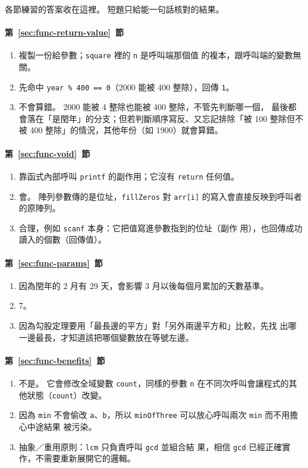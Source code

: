 各節練習的答案收在這裡。 短題只給能一句話核對的結果。

\paragraph{第~\ref{sec:func-return-value}~節}
\begin{enumerate}
\item 複製一份給參數；\texttt{square} 裡的 \texttt{n} 是呼叫端那個值
的複本，跟呼叫端的變數無關。
\item 先命中 \texttt{year \% 400 == 0}（2000 能被 400 整除），回傳
\texttt{1}。
\item 不會算錯。 2000 能被 4 整除也能被 400 整除，不管先判斷哪一個，
最後都會落在「是閏年」的分支；但若判斷順序寫反、又忘記排除「被 100
整除但不被 400 整除」的情況，其他年份（如 1900）就會算錯。
\end{enumerate}

\paragraph{第~\ref{sec:func-void}~節}
\begin{enumerate}
\item 靠函式內部呼叫 \texttt{printf} 的副作用；它沒有 \texttt{return}
任何值。
\item 會。 陣列參數傳的是位址，\texttt{fillZeros} 對 \texttt{arr[i]}
的寫入會直接反映到呼叫者的原陣列。
\item 合理，例如 \texttt{scanf} 本身：它把值寫進參數指到的位址（副作
用），也回傳成功讀入的個數（回傳值）。
\end{enumerate}

\paragraph{第~\ref{sec:func-params}~節}
\begin{enumerate}
\item 因為閏年的 2 月有 29 天，會影響 3 月以後每個月累加的天數基準。
\item 7。
\item 因為勾股定理要用「最長邊的平方」對「另外兩邊平方和」比較，先找
出哪一邊最長，才知道該把哪個變數放在等號左邊。
\end{enumerate}

\paragraph{第~\ref{sec:func-benefits}~節}
\begin{enumerate}
\item 不是。 它會修改全域變數 \texttt{count}，同樣的參數 \texttt{n}
在不同次呼叫會讓程式的其他狀態（\texttt{count}）改變。
\item 因為 \texttt{min} 不會偷改 \texttt{a}、\texttt{b}，所以
\texttt{minOfThree} 可以放心呼叫兩次 \texttt{min} 而不用擔心中途結果
被污染。
\item 抽象／重用原則：\texttt{lcm} 只負責呼叫 \texttt{gcd} 並組合結
果，相信 \texttt{gcd} 已經正確實作，不需要重新展開它的邏輯。
\end{enumerate}

